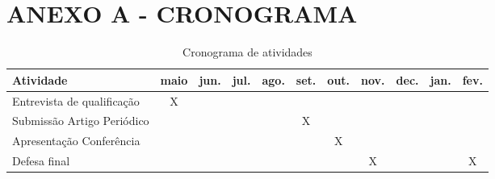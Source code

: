 
\renewcommand{\thechapter}{}%
\chapter{ANEXO A - CRONOGRAMA}
\label{anexoA}
\renewcommand{\thechapter}{A}

\begin{table}[!ht]
  \label{tab:cronograma}
  \begin{center}
	\caption{Cronograma de atividades}
	\begin{tabular*}{\textwidth}{|p{3cm}|c|c|c|c|c|c|c|c|c|c|} %
		\hline
		\textbf{Atividade} & maio & jun. & jul. & ago. & set. & out. & nov. & dec. & jan. & fev. \\
		\hline
		Entrevista de qualificação &X&&&&&&&&& \\
		\hline
		Submissão Artigo Periódico &&&&&X&&&&& \\
		\hline
		Apresentação Conferência &&&&&&X&&&& \\
		\hline
		Defesa final &&&&&&&X&&&X \\
		\hline
	\end{tabular*}
   \end{center}
\end{table}

